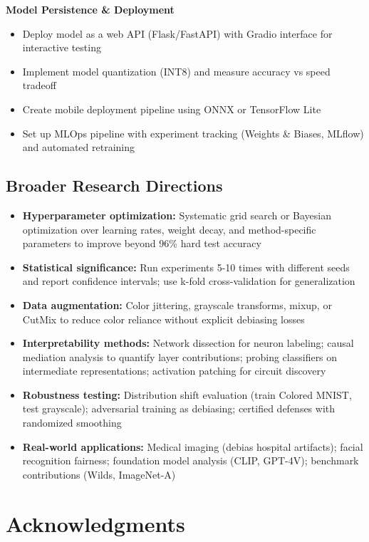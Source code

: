 \documentclass[9pt,a4paper,twocolumn,twoside]{tau-class/tau}
\begin{document}
        \textbf{Model Persistence \& Deployment}
        \begin{itemize}
            \item Deploy model as a web API (Flask/FastAPI) with Gradio interface for interactive testing
            \item Implement model quantization (INT8) and measure accuracy vs speed tradeoff
            \item Create mobile deployment pipeline using ONNX or TensorFlow Lite
            \item Set up MLOps pipeline with experiment tracking (Weights \& Biases, MLflow) and automated retraining
        \end{itemize}

    \subsection{Broader Research Directions}
        \begin{itemize}
            \item \textbf{Hyperparameter optimization:} Systematic grid search or Bayesian optimization over learning rates, weight decay, and method-specific parameters to improve beyond 96\% hard test accuracy
            \item \textbf{Statistical significance:} Run experiments 5-10 times with different seeds and report confidence intervals; use k-fold cross-validation for generalization
            \item \textbf{Data augmentation:} Color jittering, grayscale transforms, mixup, or CutMix to reduce color reliance without explicit debiasing losses
            \item \textbf{Interpretability methods:} Network dissection for neuron labeling; causal mediation analysis to quantify layer contributions; probing classifiers on intermediate representations; activation patching for circuit discovery
            \item \textbf{Robustness testing:} Distribution shift evaluation (train Colored MNIST, test grayscale); adversarial training as debiasing; certified defenses with randomized smoothing
            \item \textbf{Real-world applications:} Medical imaging (debias hospital artifacts); facial recognition fairness; foundation model analysis (CLIP, GPT-4V); benchmark contributions (Wilds, ImageNet-A)
        \end{itemize}

\section*{Acknowledgments}
\end{document}
